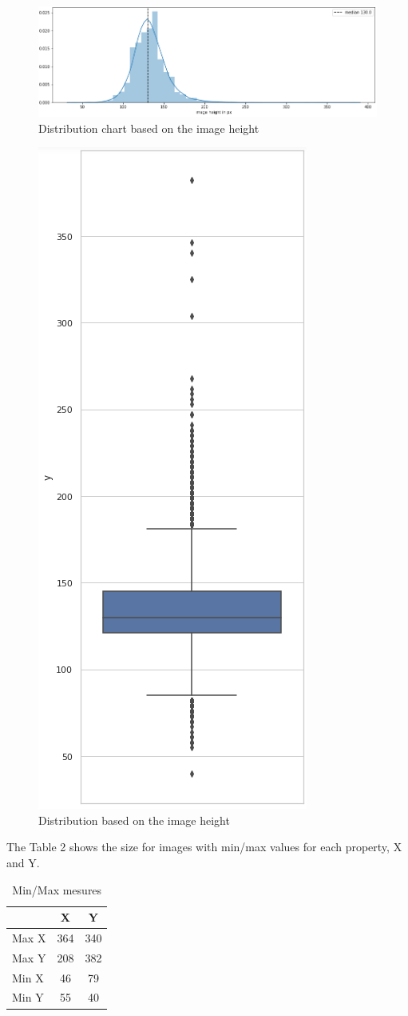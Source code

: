 \documentclass[a4paper]{article}
\begin{document}
	\begin{figure}[H]
		\centering
		\includegraphics[width=.9\textwidth]{dist_y.png}
		\caption{Distribution chart based on the image height}
		\label{fig:height_dist}
	\end{figure}
	\begin{figure}[H]
		\centering
		\includegraphics[width=.5\textwidth]{box_y.png}
		\caption{Distribution based on the image height}
		\label{fig:height_box}
	\end{figure}

	\medskip
	The Table 2 shows the size for images with min/max values for each property, X and Y.

	\medskip
	\begin{table}[h!]
		\centering
		\caption{Min/Max mesures}
		\label{tab:minmax}
		\begin{tabular}{l|c|c}
			\textbf{} & {X} & {Y} \\
			\hline
			Max X & 364 & 340 \\
			Max Y & 208 & 382 \\
			Min X & 46 & 79 \\
			Min Y & 55 & 40 \\
		\end{tabular}
	\end{table}
	
\end{document}
